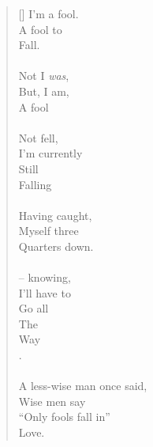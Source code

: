 \documentclass{article}
\begin{document}
\settowidth{\versewidth}{Than Tycho Brahe, or Erra Pater:}
\begin{verse}[\versewidth]
I'm a fool. \\
A fool to \\
Fall. \\
\\
Not I \textit{was}, \\
But, I am, \\
A fool \\
\\
Not fell, \\
I'm currently \\
Still \\
Falling \\
\\
Having caught, \\
Myself \tab three \\
Quarters down. \\
\\
{\tab -- \tab } knowing, \\
I'll have to \\
Go all \\
The \\
Way \\. \\
\\
A less-wise man once said, \\
Wise men say \\
``Only fools fall in'' \\
Love. \\
\end{verse}

\newpage
\end{document}
